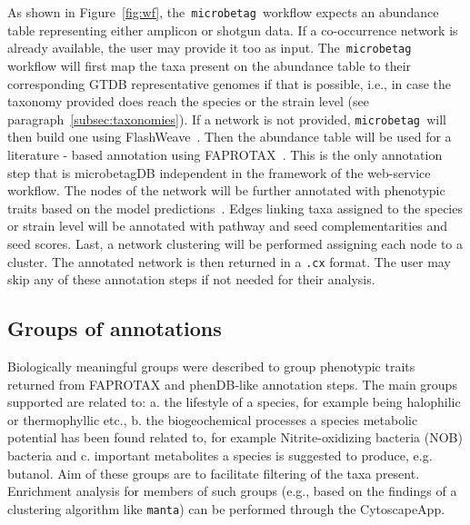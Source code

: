\documentclass[sn-mathphys,Numbered]{sn-jnl}  %
\theoremstyle{thmstyleone}%
\theoremstyle{thmstyletwo}%
\theoremstyle{thmstylethree}%
\newcommand{\microbetag}{\texttt{microbetag }}
\begin{document}
        As shown in Figure~\ref{fig:wf}, the~\microbetag workflow expects an abundance table representing either amplicon or shotgun data.
        If a co-occurrence network is already available, the user may provide it too as input.
        The~\microbetag workflow will first map the taxa present on the abundance table to their corresponding GTDB representative genomes if that is possible, i.e., in case the taxonomy provided does reach the species or the strain level (see paragraph~\ref{subsec:taxonomies}).
        If a network is not provided, \microbetag will then build one using FlashWeave~\cite{flashweave_cite}. 
        Then the abundance table will be used for a literature - based annotation using FAPROTAX~\cite{louca2016decoupling}.
        This is the only annotation step that is microbetagDB independent in the framework of the web-service workflow.
        The nodes of the network will be further annotated with phenotypic traits based on the model predictions~\cite{feldbauer2015prediction}.
        Edges linking taxa assigned to the species or strain level will be annotated with pathway and seed complementarities and seed scores.
        Last, a network clustering will be performed assigning each node to a cluster.
        The annotated network is then returned in a \texttt{.cx} format. 
        The user may skip any of these annotation steps if not needed for their analysis.




    \subsection*{Groups of annotations}
    \label{subsec:groups}

        Biologically meaningful groups were described to group phenotypic traits returned from FAPROTAX and phenDB-like annotation steps.
        The main groups supported are related to: 
        a. the lifestyle of a species, for example being halophilic or thermophyllic etc.,
        b. the biogeochemical processes a species metabolic potential has been found related to, for example Nitrite-oxidizing bacteria (NOB) bacteria and 
        c. important metabolites a species is suggested to produce, e.g. butanol.
        Aim of these groups are to facilitate filtering of the taxa present.
        Enrichment analysis for members of such groups 
        (e.g., based on the findings of a clustering algorithm like \texttt{manta}) 
        can be performed through the CytoscapeApp.
\end{document}

